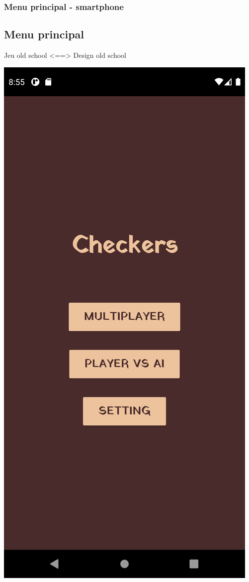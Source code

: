 \documentclass{beamer}
\begin{document}
\begin{frame}
  \frametitle{Menu principal - smartphone}
  \subsection{Menu principal}

  \begin{center}
    Jeu old school <==> Design old school
  \end{center}

  \begin{center}
    \includegraphics[scale=0.05]{menu_principal.png}

\end{center}
\end{frame}
\end{document}
